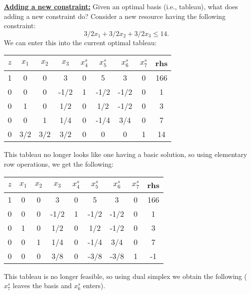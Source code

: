 \bigskip  \underline{\bf Adding a new constraint:}
Given an optimal basis (i.e., tableau), what does adding a new constraint do? Consider a new resource having the following constraint: $$3/2 x_1 + 3/2x_2 + 3/2x_3 \le 14.$$
We can enter this into the current optimal tableau:
\begin{center} \begin{tabular} {|c|c|c|c|c|c|c|c|c|} \hline $z$ & $x_1$ & $x_2$ & $x_3$ & $x^{s}_4$ & $x^{s}_5$ & $x^{s}_6$ &  $x^{s}_7$  & rhs   \\ \hline
\hline  1  & 0     & 0     & 3      & 0    & 5     & 3     & 0       & 166   \\
\hline  0  & 0     & 0     & -1/2   & 1    & -1/2  & -1/2  & 0       & 1     \\
\hline  0  & 1     & 0     & 1/2    & 0    & 1/2   & -1/2  & 0       & 3    \\
\hline  0  & 0     & 1     & 1/4    & 0    & -1/4  & 3/4   & 0       & 7     \\
\hline  0  & 3/2   & 3/2   & 3/2    & 0    & 0     & 0     & 1       & 14   \\ \hline
\end{tabular} \end{center}
This tableau no longer looks like one having a basic solution, so using elementary row operations, we get the following:
\begin{center} \begin{tabular} {|c|c|c|c|c|c|c|c|c|} \hline 
$z$ & $x_1$ & $x_2$ & $x_3$ & $x^s_4$ & $x^s_5$ & $x^s_6$ &  $x^s_7$  & rhs   \\ \hline
\hline  1  & 0     & 0     & 3      & 0    & 5     & 3     & 0       & 166   \\
\hline  0  & 0     & 0     & -1/2   & 1    & -1/2  & -1/2  & 0       & 1     \\
\hline  0  & 1     & 0     & 1/2    & 0    & 1/2   & -1/2  & 0       & 3    \\
\hline  0  & 0     & 1     & 1/4    & 0    & -1/4  & 3/4   & 0       & 7     \\
\hline  0  & 0     & 0     & 3/8    & 0    & -3/8  & -3/8  & 1       & -1 \\ \hline
\end{tabular} \end{center}
This tableau is no longer feasible, so using dual simplex we obtain the following ($x^s_7$ leaves the basis and $x^s_6$ enters).


